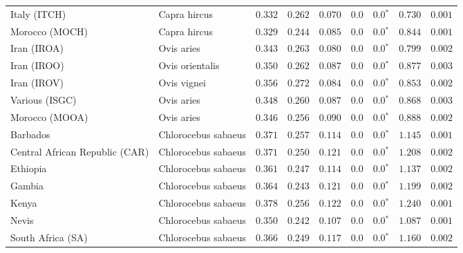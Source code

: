 \begin{center}
\begin{adjustbox}{width = 1\textwidth}
\begin{tabular}{|l|l|r|r|r|r|r|r|r|}
            Italy (ITCH)                    & Capra hircus          & $ 0.332$ & $ 0.262$ & $ 0.070$ & $0.0$ & $\bm{0.0{^*}}$ & $ 0.730$ & $ 0.001$  \\
            Morocco (MOCH)                    & Capra hircus     & $ 0.329$ & $ 0.244$ & $ 0.085$ & $0.0$ & $\bm{0.0{^*}}$ & $ 0.844$ & $ 0.001$ \\
            Iran (IROA)                    & Ovis aries         & $ 0.343$ & $ 0.263$ & $ 0.080$ & $0.0$ & $\bm{0.0{^*}}$ & $ 0.799$ & $ 0.002$ \\
            Iran (IROO)                 & Ovis orientalis          & $ 0.350$ & $ 0.262$ & $ 0.087$ & $0.0$ & $\bm{0.0{^*}}$ & $ 0.877$ & $ 0.003$ \\
            Iran (IROV)                 & Ovis vignei          & $ 0.356$ & $ 0.272$ & $ 0.084$ & $0.0$ & $\bm{0.0{^*}}$ & $ 0.853$ & $ 0.002$ \\
            Various (ISGC)                       & Ovis aries & $ 0.348$ & $ 0.260$ & $ 0.087$ & $0.0$ & $\bm{0.0{^*}}$ & $ 0.868$ & $ 0.003$ \\
            Morocco (MOOA) & Ovis aries & $ 0.346$ & $ 0.256$ & $ 0.090$ & $0.0$ & $\bm{0.0{^*}}$ & $ 0.888$ & $ 0.002$ \\
            Barbados                       & Chlorocebus sabaeus & $ 0.371$ & $ 0.257$ & $ 0.114$ & $0.0$ & $\bm{0.0{^*}}$ & $ 1.145$ & $ 0.001$ \\
            Central African Republic (CAR)                         & Chlorocebus sabaeus & $ 0.371$ & $ 0.250$ & $ 0.121$ & $0.0$ & $\bm{0.0{^*}}$ & $ 1.208$ & $ 0.002$ \\
            Ethiopia                          & Chlorocebus sabaeus & $ 0.361$ & $ 0.247$ & $ 0.114$ & $0.0$ & $\bm{0.0{^*}}$ & $ 1.137$ & $ 0.002$ \\
            Gambia                          & Chlorocebus sabaeus & $ 0.364$ & $ 0.243$ & $ 0.121$ & $0.0$ & $\bm{0.0{^*}}$ & $ 1.199$ & $ 0.002$ \\
            Kenya              & Chlorocebus sabaeus & $ 0.378$ & $ 0.256$ & $ 0.122$ & $0.0$ & $\bm{0.0{^*}}$ & $ 1.240$ & $ 0.001$ \\
            Nevis               & Chlorocebus sabaeus & $ 0.350$ & $ 0.242$ & $ 0.107$ & $0.0$ & $\bm{0.0{^*}}$ & $ 1.087$ & $ 0.001$ \\
            South Africa (SA)                         & Chlorocebus sabaeus & $ 0.366$ & $ 0.249$ & $ 0.117$ & $0.0$ & $\bm{0.0{^*}}$ & $ 1.160$ & $ 0.002$ \\

\end{tabular}
\end{adjustbox}
\end{center}
